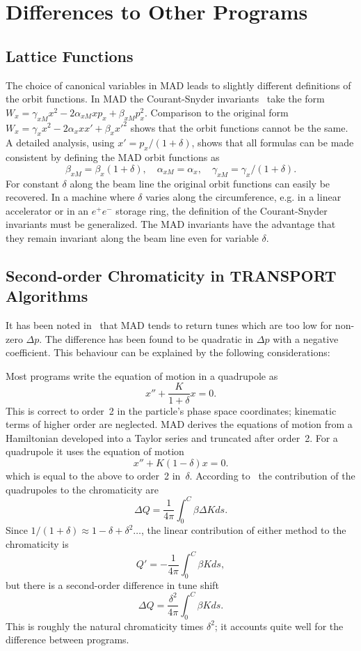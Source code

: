 \section{Differences to Other Programs}
\label{diff}

\subsection{Lattice Functions}
The choice of canonical variables in MAD
leads to slightly different definitions of the orbit functions.
In MAD the Courant-Snyder invariants~\cite{COU58}
take the form
$W_x = \gamma_{xM} x^2 - 2 \alpha_{xM} x p_x + \beta_{xM} p_x^2$.
Comparison to the original form
$W_x = \gamma_x x^2 - 2 \alpha_x x x' + \beta_x x'^2$
shows that the orbit functions cannot be the same.
A detailed analysis, using $x' = p_x / (1 + \delta)$,
shows that all formulas can be made consistent by defining the MAD
orbit functions as
\[
\beta_{xM} = \beta_x (1 + \delta) , \quad
\alpha_{xM} = \alpha_x, \quad
\gamma_{xM} = \gamma_x / (1 + \delta).
\]
For constant $\delta$ along the beam line the original orbit functions
can easily be recovered.
In a machine where $\delta$ varies along the circumference, e.g. in a
linear accelerator or in an $e^+e^-$ storage ring,
the definition of the Courant-Snyder invariants must be generalized.
The MAD invariants have the advantage that they
remain invariant along the beam line even for variable $\delta$.
 
\subsection{Second-order Chromaticity in TRANSPORT Algorithms}
It has been noted in~\cite{MIL88} that MAD tends
to return tunes which are too low for non-zero $\Delta p$.
The difference has been found to be quadratic in $\Delta p$ with a
negative coefficient.
This behaviour can be explained by the following considerations:
 
Most programs write the equation of motion in a quadrupole as
\[
x'' + \frac{K}{1 + \delta} x = 0.
\]
This is correct to order~2 in the particle's phase space coordinates;
kinematic terms of higher order are neglected.
MAD derives the equations of motion from a Hamiltonian
developed into a Taylor series and truncated after order~2.
For a quadrupole it uses the equation of motion
\[
x'' + K (1 - \delta) x = 0.
\]
which is equal to the above to order~2 in~$\delta$.
According to~\cite{COU58} the contribution of the quadrupoles to
the chromaticity are
\[
\Delta Q = \frac{1}{4 \pi} \int_0^C \beta \Delta K ds.
\]
Since $1 / (1 + \delta) \approx 1 - \delta + \delta^2 \ldots$,
the linear contribution of either method to the chromaticity is
\[
Q' = - \frac{1}{4 \pi} \int_0^C \beta K ds,
\]
but there is a second-order difference in tune shift
\[
\Delta Q = \frac{\delta^2}{4 \pi} \int_0^C \beta K ds.
\]
This is roughly the natural chromaticity times $\delta^2$;
it accounts quite well for the difference between programs.

